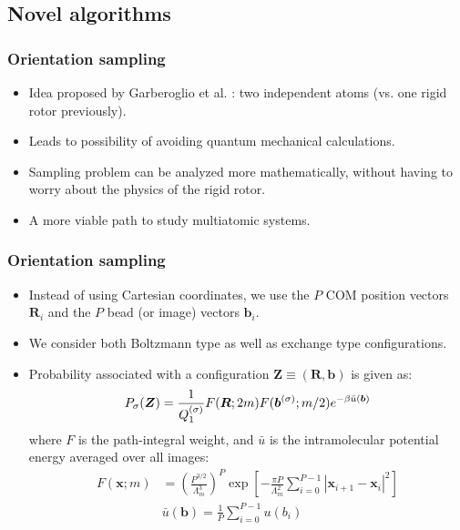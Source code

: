 \documentclass[xcolor=svgnames]{beamer}
\DeclareRobustCommand{\mbf}[1]{{\boldsymbol {#1}}}
\begin{document}
        \subsection{Novel algorithms}
        \begin{frame}
            \frametitle{Orientation sampling}
            \begin{itemize}
                \item Idea proposed by Garberoglio et al. : two independent atoms (vs. one rigid rotor previously).
                \item Leads to possibility of avoiding quantum mechanical calculations.
                \item Sampling problem can be analyzed more mathematically, without having to worry about the physics of the rigid rotor.
                \item A more viable path to study multiatomic systems.
            \end{itemize}
        \end{frame}
        \begin{frame}
            \frametitle{Orientation sampling}
            \begin{itemize}
                \item Instead of using Cartesian coordinates, we use the $P$ COM position vectors $\mbf{R}_i$ and the $P$ bead (or image) vectors $\mbf{b}_i$.
                \item We consider both Boltzmann type as well as exchange type configurations.
                \item Probability associated with a configuration $\mbf{Z} \equiv (\mbf{R},\mbf{b})$ is given as:
                \begin{equation*}
                \label{eq:PIProb}
                    P_\sigma (\mbf{Z}) = \frac{1}{Q_1^{{\rm (\sigma)}}} F(\mbf{R};2m) F(\mbf{b}^{(\sigma)};m/2) e^{ - \beta \bar u(\mbf{b})}
                \end{equation*}
                where $F$ is the path-integral weight, and $\bar u$ is the intramolecular potential energy averaged over all images:
                \begin{equation*}
                    \begin{aligned}
                        F(\mbf{x};m) &= \left( \frac{P^{3/2}} {\Lambda _m^3} \right)^P \exp \left[ - \frac{\pi P}{\Lambda _m^2}\sum\limits_{i = 0}^{P-1} \left| \mbf{x}_{i + 1} - \mbf{x}_i \right|^2 \right]\\
                        &\bar u(\mbf{b}) = \frac{1}{P}\sum\limits_{i=0}^{P-1} {u\left(b_i \right)}
                    \end{aligned}
                \end{equation*}
            \end{itemize}
        \end{frame}
\end{document}
